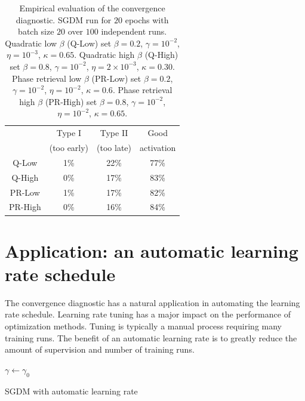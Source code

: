 \documentclass[conference]{IEEEtran}
\begin{document}
\begin{table}[t]
\caption{
Empirical evaluation of the convergence diagnostic.
SGDM run for $20$ epochs with batch size $20$ over $100$ independent runs.
Quadratic low $\beta$ (Q-Low) set $\beta = 0.2$, $\gamma = 10^{-2}$, $\eta = 10^{-3}$, $\kappa = 0.65$. 
Quadratic high $\beta$ (Q-High) set $\beta = 0.8$, $\gamma = 10^{-2}$, $\eta = 2 \times 10^{-3}$, $\kappa = 0.30$. 
Phase retrieval low $\beta$ (PR-Low) set $\beta=0.2$, $\gamma=10^{-2}$, $\eta = 10^{-2}$, $\kappa = 0.6$. 
Phase retrieval high $\beta$ (PR-High) set $\beta=0.8$, $\gamma=10^{-2}$, $\eta = 10^{-2}$, $\kappa = 0.65$.
\vspace{-0.1in}}
\label{tab:diag_errors}
\begin{center}
\begin{tabular}{|c| c c c|} 
\hline
 & Type I & Type II & Good \\ %
 & (too early) & (too late) & activation \\
\hline%
Q-Low & 1\% & 22\% & 77\% \\ 
\hline
Q-High & 0\% & 17\% & 83\% \\ 
\hline
PR-Low & 1\% & 17\% & 82\% \\ 
\hline
PR-High & 0\% & 16\% & 84\% \\ 
\hline
\end{tabular}
\end{center}
\end{table}

\section{Application: an automatic learning rate schedule}
\label{sec:autoLR}
The convergence diagnostic has a natural application in automating the learning rate schedule.
Learning rate tuning has a major impact on the performance of optimization methods.
Tuning is typically a manual process requiring many training runs. 
The benefit of an automatic learning rate is to greatly reduce the amount of supervision and number of training runs. 

\begin{algorithm}[ht]
$\gamma \gets \gamma_0$ \\
\Return{ $\theta$}
\caption{SGDM with automatic learning rate}
\label{alg:autoLR}
\end{algorithm}
\end{document}
